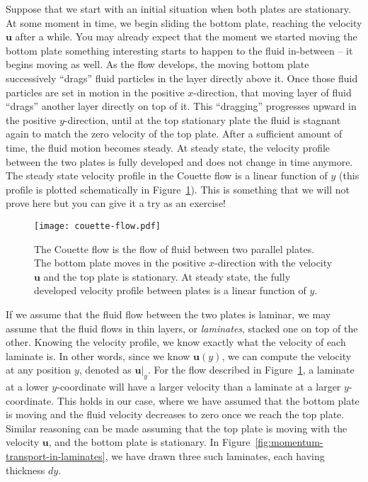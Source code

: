 \documentclass[10pt,twocolumn]{article}
\begin{document}
Suppose that we start with an initial situation when both plates are stationary. At some moment in time, we begin sliding the bottom plate, reaching the velocity $\mathbf{u}$ after a while. You may already expect that the moment we started moving the bottom plate something interesting starts to happen to the fluid in-between -- it begins moving as well. As the flow develops, the moving bottom plate successively ``drags'' fluid particles in the layer directly above it. Once those fluid particles are set in motion in the positive $x$-direction, that moving layer of fluid ``drags'' another layer directly on top of it. This ``dragging'' progresses upward in the positive $y$-direction, until at the top stationary plate the fluid is stagnant again to match the zero velocity of the top plate. 
After a sufficient amount of time, the fluid motion becomes steady. At steady state, the velocity profile between the two plates is fully developed and does not change in time anymore. The steady state velocity profile in the Couette flow is a linear function of $y$ (this profile is plotted schematically in Figure~\ref{fig:couette-flow}). This is something that we will not prove here but you can give it a try as an exercise!
\begin{figure}[t!]
\centering\texttt{[image: couette-flow.pdf]}
\caption{The Couette flow is the flow of fluid between two parallel plates. The bottom plate moves in the positive $x$-direction with the velocity $\mathbf{u}$ and the top plate is stationary. At steady state, the fully developed velocity profile between plates is a linear function of $y$.}
\label{fig:couette-flow}
\end{figure}

If we assume that the fluid flow between the two plates is laminar, we may assume that the fluid flows in thin layers, or \textit{laminates}, stacked one on top of the other. Knowing the velocity profile, we know exactly what the velocity of each laminate is. In other words, since we know $\mathbf{u}(y)$, we can compute the velocity at any position $y$, denoted as $\mathbf{u}|_{y}$. For the flow described in Figure~\ref{fig:couette-flow}, a laminate at a lower $y$-coordinate will have a larger velocity than a laminate at a larger $y$-coordinate. This holds in our case, where we have assumed that the bottom plate is moving and the fluid velocity decreases to zero once we reach the top plate. Similar reasoning can be made assuming that the top plate is moving with the velocity $\mathbf{u}$, and the bottom plate is stationary. In Figure~\ref{fig:momentum-transport-in-laminates}, we have drawn three such laminates, each having thickness $dy$.
\end{document}
